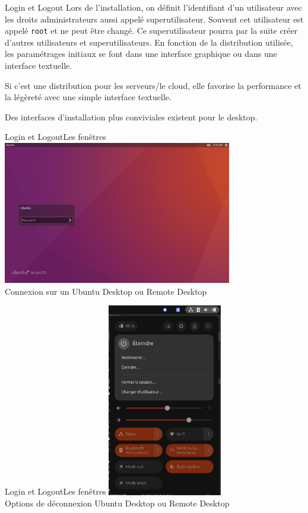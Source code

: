\documentclass{beamer}
\begin{document}
    \begin{frame}{Login et Logout}
        Lors de l'installation, on définit l'identifiant d'un utilisateur avec les droits administrateurs aussi appelé superutilisateur.
        Souvent cet utilisateur est appelé \lstinline{root} et ne peut être changé.
        \bigbreak
        Ce superutilisateur pourra par la suite créer d'autres utilisateurs et superutilisateurs.
        \bigbreak
        En fonction de la distribution utilisée, les paramétrages initiaux se font dans une interface graphique ou dans une interface textuelle.

        Si c'est une distribution pour les serveurs/le cloud, elle favorise la performance et la légèreté avec une simple interface textuelle.

        Des interfaces d'installation plus conviviales existent pour le desktop.
    \end{frame}

    \begin{frame}{Login et Logout}{Les fenêtres}
        \centering
        \includegraphics[width=10cm]{image/Ubuntu-login-screen} \\ Connexion sur un Ubuntu Desktop ou Remote Desktop \\
    \end{frame}

    \begin{frame}{Login et Logout}{Les fenêtres}
        \centering
        \includegraphics[width=5cm]{image/Ubuntu-logout-screen} \\ Options de déconnexion Ubuntu Desktop ou Remote Desktop \\
    \end{frame}
\end{document}
